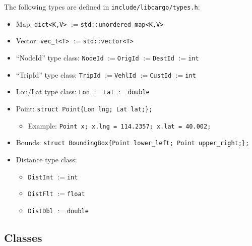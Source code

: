 \documentclass[11pt,letterpaper]{article}
\newcommand{\code}[1]{\texttt{#1}}
\newcommand{\deq}{\ensuremath{:=}}
\begin{document}
The following types are defined in \code{include/libcargo/types.h}:
\begin{itemize}[leftmargin=*]
    \item[] Map: \code{dict<K,V>} \deq \code{std::unordered\_map<K,V>}
    \item[] Vector: \code{vec\_t<T>} \deq \code{std::vector<T>}
    \item[] ``NodeId'' type class: \code{NodeId} \deq \code{OrigId} \deq \code{DestId} \deq \code{int}
    \item[] ``TripId'' type class: \code{TripId} \deq \code{VehlId} \deq \code{CustId} \deq \code{int}
    \item[] Lon/Lat type class: \code{Lon} \deq \code{Lat} \deq \code{double}
    \item[] Point: \code{struct Point\{Lon lng; Lat lat;\};}
        \begin{itemize}
            {\vspace{-4mm}}
            \item[] Example: \code{Point x; x.lng = 114.2357; x.lat = 40.002; }
        \end{itemize}
    \item[] Bounds: \code{struct BoundingBox\{Point lower\_left; Point upper\_right;\};}
    \item[] Distance type class:
        \begin{itemize}
            {\vspace{-4mm}}
            \item[] \code{DistInt} \deq \code{int}
            \item[] \code{DistFlt} \deq \code{float}
            \item[] \code{DistDbl} \deq \code{double}
        \end{itemize}

\end{itemize}

\subsection{Classes}
\end{document}
